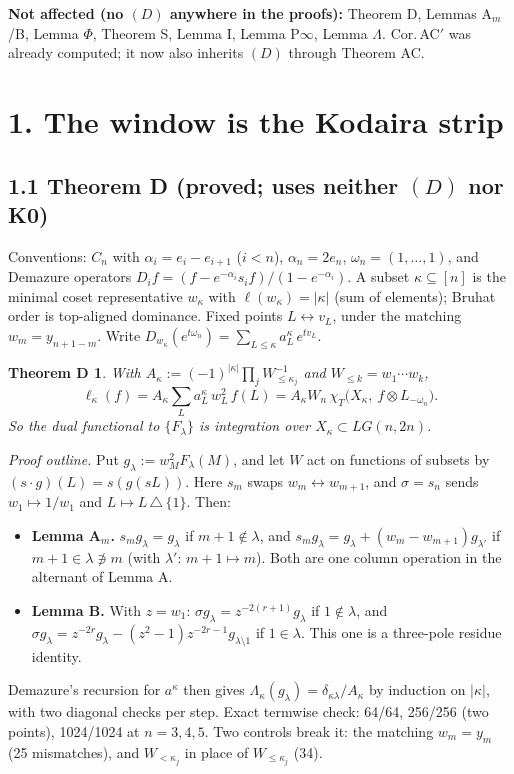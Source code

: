 \documentclass[11pt]{article}
\newcommand{\gr}[1]{\textsf{#1}}
\theoremstyle{plain}
\newtheorem*{thmD}{Theorem D}
\begin{document}
\textbf{Not affected (no $(D)$ anywhere in the proofs):} Theorem D, Lemmas A$_m$/B, Lemma $\Phi$, Theorem S, Lemma I,
Lemma P$\infty$, Lemma $\Lambda$. Cor.\,AC$'$ was already \gr{computed}; it now also inherits $(D)$ through Theorem AC.

\section*{1. The window is the Kodaira strip}
\subsection*{1.1 Theorem D (\gr{proved}; uses neither $(D)$ nor K0)}
Conventions: $C_n$ with $\alpha_i=e_i-e_{i+1}$ ($i<n$), $\alpha_n=2e_n$, $\omega_n=(1,\dots,1)$, and Demazure operators
$D_i f=(f-e^{-\alpha_i}s_if)/(1-e^{-\alpha_i})$. A subset $\kappa\subseteq[n]$ is the minimal coset representative
$w_\kappa$ with $\ell(w_\kappa)=|\kappa|$ (sum of elements); Bruhat order is top-aligned dominance. Fixed points
$L\leftrightarrow v_L$, under the matching $w_m=y_{n+1-m}$. Write
$D_{w_\kappa}(e^{t\omega_n})=\sum_{L\le\kappa}a^\kappa_L\,e^{tv_L}$.

\begin{thmD}
With $A_\kappa:=(-1)^{|\kappa|}\prod_j W_{\le\kappa_j}^{-1}$ and $W_{\le k}=w_1\cdots w_k$,
\[
\ell_\kappa(f)=A_\kappa\sum_L a^\kappa_L\,w_L^2\,f(L)=A_\kappa W_n\,\chi_T\big(X_\kappa,\ f\otimes L_{-\omega_n}\big).
\]
So the dual functional to $\{F_\lambda\}$ is integration over $X_\kappa\subset LG(n,2n)$.
\end{thmD}
\emph{Proof outline.} Put $g_\lambda:=w_M^2F_\lambda(M)$, and let $W$ act on functions of subsets by
$(s\cdot g)(L)=s(g(sL))$. Here $s_m$ swaps $w_m\leftrightarrow w_{m+1}$, and $\sigma=s_n$ sends $w_1\mapsto1/w_1$ and
$L\mapsto L\,\triangle\,\{1\}$. Then:
\begin{itemize}[leftmargin=*,itemsep=1pt]
\item \textbf{Lemma A$_m$.} $s_m g_\lambda=g_\lambda$ if $m{+}1\notin\lambda$, and
  $s_m g_\lambda=g_\lambda+(w_m-w_{m+1})g_{\lambda'}$ if $m{+}1\in\lambda\not\ni m$ (with $\lambda'$: $m{+}1\mapsto m$).
  Both are one column operation in the alternant of Lemma A.
\item \textbf{Lemma B.} With $z=w_1$: $\sigma g_\lambda=z^{-2(r+1)}g_\lambda$ if $1\notin\lambda$, and
  $\sigma g_\lambda=z^{-2r}g_\lambda-(z^2-1)z^{-2r-1}g_{\lambda\setminus1}$ if $1\in\lambda$. This one is a three-pole
  residue identity.
\end{itemize}
Demazure's recursion for $a^\kappa$ then gives $\Lambda_\kappa(g_\lambda)=\delta_{\kappa\lambda}/A_\kappa$ by induction
on $|\kappa|$, with two diagonal checks per step. Exact termwise check: 64/64, 256/256 (two points), 1024/1024 at
$n=3,4,5$. Two controls break it: the matching $w_m=y_m$ (25 mismatches), and $W_{<\kappa_j}$ in place of
$W_{\le\kappa_j}$ (34).
\end{document}
